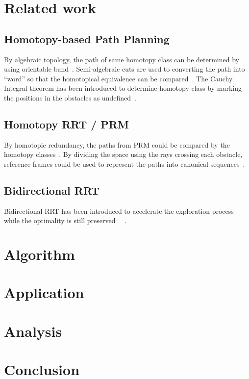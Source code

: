 \documentclass[letterpaper, 10 pt, conference]{ieeeconf}
\begin{document}
\section{Related work}
\label{sec:related_work}

\subsection{Homotopy-based Path Planning}

By algebraic topology, the path of same homotopy class can be determined by using orientable band~\cite{Hershberger199463}.
Semi-algebraic cuts are used to converting the path into ``word'' so that the homotopical equivalence can be compared~\cite{Grigoriev:1998:PAS:281508.281528}.
The Cauchy Integral theorem has been introduced to determine homotopy class by marking the positions in the obstacles as undefined~\cite{AAAI101920}.

\subsection{Homotopy RRT / PRM}

By homotopic redundancy, the paths from PRM could be compared by the homotopy classes~\cite{1041613}.
By dividing the space using the rays crossing each obstacle, reference frames could be used to represent the paths into canonical sequences~\cite{Hernandez201544}.

\subsection{Bidirectional RRT}

Bidirectional RRT has been introduced to accelerate the exploration process while the optimality is still preserved~
\cite{Jordan.Perez.ea:CSAIL13}~\cite{starek2014bidirectional}.

\section{Algorithm}
\label{sec:algorithm}

\section{Application}
\label{sec:application}

\section{Analysis}
\label{sec:analysis}

\section{Conclusion}
\label{sec:conclusion}



\end{document}
